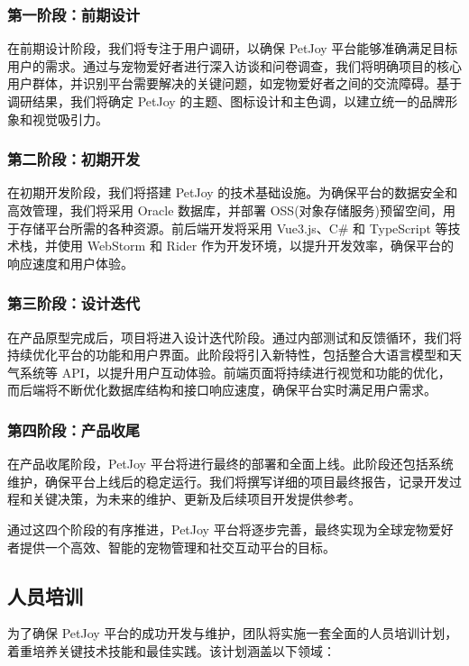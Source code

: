 \subsubsection{第一阶段：前期设计}

在前期设计阶段，我们将专注于用户调研，以确保 PetJoy 平台能够准确满足目标用户的需求。通过与宠物爱好者进行深入访谈和问卷调查，我们将明确项目的核心用户群体，并识别平台需要解决的关键问题，如宠物爱好者之间的交流障碍。基于调研结果，我们将确定 PetJoy 的主题、图标设计和主色调，以建立统一的品牌形象和视觉吸引力。

\subsubsection{第二阶段：初期开发}

在初期开发阶段，我们将搭建 PetJoy 的技术基础设施。为确保平台的数据安全和高效管理，我们将采用 Oracle 数据库，并部署 OSS(对象存储服务)预留空间，用于存储平台所需的各种资源。前后端开发将采用 Vue3.js、C\# 和 TypeScript 等技术栈，并使用 WebStorm 和 Rider 作为开发环境，以提升开发效率，确保平台的响应速度和用户体验。

\subsubsection{第三阶段：设计迭代}

在产品原型完成后，项目将进入设计迭代阶段。通过内部测试和反馈循环，我们将持续优化平台的功能和用户界面。此阶段将引入新特性，包括整合大语言模型和天气系统等 API，以提升用户互动体验。前端页面将持续进行视觉和功能的优化，而后端将不断优化数据库结构和接口响应速度，确保平台实时满足用户需求。

\subsubsection{第四阶段：产品收尾}

在产品收尾阶段，PetJoy 平台将进行最终的部署和全面上线。此阶段还包括系统维护，确保平台上线后的稳定运行。我们将撰写详细的项目最终报告，记录开发过程和关键决策，为未来的维护、更新及后续项目开发提供参考。

通过这四个阶段的有序推进，PetJoy 平台将逐步完善，最终实现为全球宠物爱好者提供一个高效、智能的宠物管理和社交互动平台的目标。

\subsection{人员培训}

为了确保 PetJoy 平台的成功开发与维护，团队将实施一套全面的人员培训计划，着重培养关键技术技能和最佳实践。该计划涵盖以下领域：

